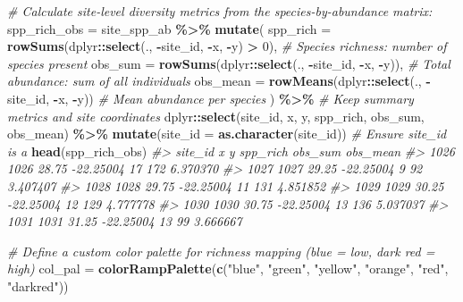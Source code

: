 \documentclass[
]{article}
\newenvironment{Shaded}{\begin{snugshade}}{\end{snugshade}}
\newcommand{\AttributeTok}[1]{\textcolor[rgb]{0.13,0.29,0.53}{#1}}
\newcommand{\CommentTok}[1]{\textcolor[rgb]{0.56,0.35,0.01}{\textit{#1}}}
\newcommand{\DecValTok}[1]{\textcolor[rgb]{0.00,0.00,0.81}{#1}}
\newcommand{\FunctionTok}[1]{\textcolor[rgb]{0.13,0.29,0.53}{\textbf{#1}}}
\newcommand{\NormalTok}[1]{#1}
\newcommand{\OtherTok}[1]{\textcolor[rgb]{0.56,0.35,0.01}{#1}}
\newcommand{\SpecialCharTok}[1]{\textcolor[rgb]{0.81,0.36,0.00}{\textbf{#1}}}
\newcommand{\StringTok}[1]{\textcolor[rgb]{0.31,0.60,0.02}{#1}}
\begin{document}
\begin{Shaded}
\begin{Highlighting}[]
\CommentTok{\# Calculate site{-}level diversity metrics from the species{-}by{-}abundance matrix:}
\NormalTok{spp\_rich\_obs }\OtherTok{=}\NormalTok{ site\_spp\_ab }\SpecialCharTok{\%\textgreater{}\%}
  \FunctionTok{mutate}\NormalTok{(}
    \AttributeTok{spp\_rich =} \FunctionTok{rowSums}\NormalTok{(dplyr}\SpecialCharTok{::}\FunctionTok{select}\NormalTok{(., }\SpecialCharTok{{-}}\NormalTok{site\_id, }\SpecialCharTok{{-}}\NormalTok{x, }\SpecialCharTok{{-}}\NormalTok{y) }\SpecialCharTok{\textgreater{}} \DecValTok{0}\NormalTok{), }\CommentTok{\# Species richness: number of species present}
    \AttributeTok{obs\_sum =} \FunctionTok{rowSums}\NormalTok{(dplyr}\SpecialCharTok{::}\FunctionTok{select}\NormalTok{(., }\SpecialCharTok{{-}}\NormalTok{site\_id, }\SpecialCharTok{{-}}\NormalTok{x, }\SpecialCharTok{{-}}\NormalTok{y)), }\CommentTok{\# Total abundance: sum of all individuals}
    \AttributeTok{obs\_mean =} \FunctionTok{rowMeans}\NormalTok{(dplyr}\SpecialCharTok{::}\FunctionTok{select}\NormalTok{(., }\SpecialCharTok{{-}}\NormalTok{site\_id, }\SpecialCharTok{{-}}\NormalTok{x, }\SpecialCharTok{{-}}\NormalTok{y)) }\CommentTok{\# Mean abundance per species}
\NormalTok{  ) }\SpecialCharTok{\%\textgreater{}\%}
  \CommentTok{\# Keep summary metrics and site coordinates}
\NormalTok{  dplyr}\SpecialCharTok{::}\FunctionTok{select}\NormalTok{(site\_id, x, y, spp\_rich, obs\_sum, obs\_mean) }\SpecialCharTok{\%\textgreater{}\%}
    \FunctionTok{mutate}\NormalTok{(}\AttributeTok{site\_id =} \FunctionTok{as.character}\NormalTok{(site\_id))  }\CommentTok{\# Ensure site\_id\textasciigrave{} is a}
\FunctionTok{head}\NormalTok{(spp\_rich\_obs)}
\CommentTok{\#\textgreater{}      site\_id     x         y spp\_rich obs\_sum obs\_mean}
\CommentTok{\#\textgreater{} 1026    1026 28.75 {-}22.25004       17     172 6.370370}
\CommentTok{\#\textgreater{} 1027    1027 29.25 {-}22.25004        9      92 3.407407}
\CommentTok{\#\textgreater{} 1028    1028 29.75 {-}22.25004       11     131 4.851852}
\CommentTok{\#\textgreater{} 1029    1029 30.25 {-}22.25004       12     129 4.777778}
\CommentTok{\#\textgreater{} 1030    1030 30.75 {-}22.25004       13     136 5.037037}
\CommentTok{\#\textgreater{} 1031    1031 31.25 {-}22.25004       13      99 3.666667}

\CommentTok{\# Define a custom color palette for richness mapping (blue = low, dark red = high)}
\NormalTok{col\_pal }\OtherTok{=} \FunctionTok{colorRampPalette}\NormalTok{(}\FunctionTok{c}\NormalTok{(}\StringTok{"blue"}\NormalTok{, }\StringTok{"green"}\NormalTok{, }\StringTok{"yellow"}\NormalTok{, }\StringTok{"orange"}\NormalTok{, }\StringTok{"red"}\NormalTok{, }\StringTok{"darkred"}\NormalTok{))}


\end{Highlighting}
\end{Shaded}
\end{document}

